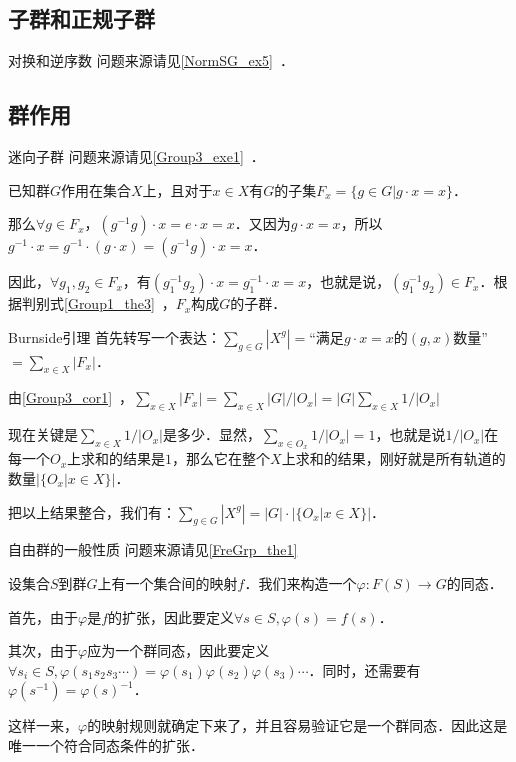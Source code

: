 
\subsection{子群和正规子群}

\begin{example}{对换和逆序数}\label{GroupP_ex1}
问题来源请见\autoref{NormSG_ex5}~．



\end{example}

\subsection{群作用}

\begin{example}{迷向子群}\label{GroupP_ex2}
问题来源请见\autoref{Group3_exe1}~．

已知群$G$作用在集合$X$上，且对于$x\in X$有$G$的子集$F_x=\{g\in G|g\cdot x=x\}$．

那么$\forall g\in F_x$，$(g^{-1}g)\cdot x=e\cdot x=x$．又因为$g\cdot x=x$，所以$g^{-1}\cdot x=g^{-1}\cdot(g\cdot x)=(g^{-1}g)\cdot x=x$．

因此，$\forall g_1, g_2\in F_x$，有$(g_1^{-1}g_2)\cdot x=g_1^{-1}\cdot x=x$，也就是说，$(g_1^{-1}g_2)\in F_x$．根据判别式\autoref{Group1_the3}~，$F_x$构成$G$的子群．




\end{example}

\begin{example}{Burnside引理}\label{GroupP_ex3}
首先转写一个表达：$\sum_{g\in G}|X^g|=$“满足$g\cdot x=x$的$(g, x)$数量”$=\sum_{x\in X}|F_x|$．

由\autoref{Group3_cor1}~，$\sum_{x\in X}|F_x|=\sum_{x\in X} |G|/|O_x|=|G| \sum_{x\in X} 1/|O_x|$

现在关键是$\sum_{x\in X} 1/|O_x|$是多少．显然，$\sum_{x\in O_x} 1/|O_x|=1$，也就是说$1/|O_x|$在每一个$O_x$上求和的结果是$1$，那么它在整个$X$上求和的结果，刚好就是所有轨道的数量$|\{O_x|x\in X\}|$．

把以上结果整合，我们有：$\sum_{g\in G}|X^g|=|G|\cdot|\{O_x|x\in X\}|$．
\end{example}

\begin{example}{自由群的一般性质}\label{GroupP_ex4}
问题来源请见\autoref{FreGrp_the1}~

设集合$S$到群$G$上有一个集合间的映射$f$．我们来构造一个$\varphi: F(S)\rightarrow G$的同态．

首先，由于$\varphi$是$f$的扩张，因此要定义$\forall s\in S, \varphi(s)=f(s)$．

其次，由于$\varphi$应为一个群同态，因此要定义$\forall s_i\in S, \varphi({s_1s_2s_3\cdots})=\varphi(s_1)\varphi(s_2)\varphi(s_3)\cdots$．同时，还需要有$\varphi(s^{-1})=\varphi(s)^{-1}$．

这样一来，$\varphi$的映射规则就确定下来了，并且容易验证它是一个群同态．因此这是唯一一个符合同态条件的扩张．


\end{example}

